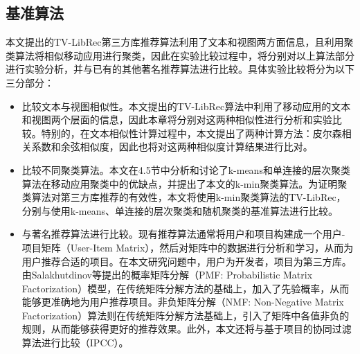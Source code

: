 \subsection{基准算法}
本文提出的TV-LibRec第三方库推荐算法利用了文本和视图两方面信息，且利用聚类算法将相似移动应用进行聚类，因此在实验比较过程中，将分别对以上算法部分进行实验分析，并与已有的其他著名推荐算法进行比较。具体实验比较将分为以下三分部分：
\begin{itemize}
\item
比较文本与视图相似性。本文提出的TV-LibRec算法中利用了移动应用的文本和视图两个层面的信息，因此本章将分别对这两种相似性进行分析和实验比较。特别的，在文本相似性计算过程中，本文提出了两种计算方法：皮尔森相关系数和余弦相似度，因此也将对这两种相似度计算结果进行比对。

\item
比较不同聚类算法。本文在4.5节中分析和讨论了k-means和单连接的层次聚类算法在移动应用聚类中的优缺点，并提出了本文的k-min聚类算法。为证明聚类算法对第三方库推荐的有效性，本文将使用k-min聚类算法的TV-LibRec，分别与使用k-means、单连接的层次聚类和随机聚类的基准算法进行比较。

\item
与著名推荐算法进行比较。现有推荐算法通常将用户和项目构建成一个用户-项目矩阵（User-Item Matrix），然后对矩阵中的数据进行分析和学习，从而为用户推荐合适的项目。在本文研究问题中，用户为开发者，项目为第三方库。由Salakhutdinov等\cite{salakhutdinov2011probabilistic}提出的概率矩阵分解（PMF: Probabilistic Matrix Factorization）模型，在传统矩阵分解方法的基础上，加入了先验概率，从而能够更准确地为用户推荐项目\cite{liu2013bayesian}。非负矩阵分解（NMF: Non-Negative Matrix Factorization）算法则在传统矩阵分解方法基础上，引入了矩阵中各值非负的规则，从而能够获得更好的推荐效果\cite{luo2014efficient}。此外，本文还将与基于项目的协同过滤算法进行比较（IPCC）\cite{yang2014survey}。
\end{itemize}


